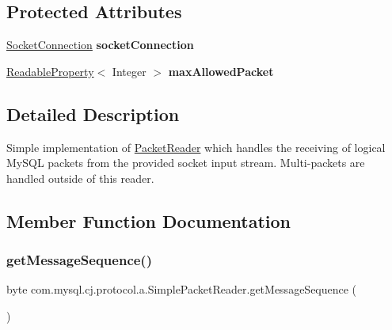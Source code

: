 \subsection*{Protected Attributes}
\begin{DoxyCompactItemize}
\item 
\mbox{\label{classcom_1_1mysql_1_1cj_1_1protocol_1_1a_1_1_simple_packet_reader_a6da8bf24cf02fc7519f2080940126bb8}} 
\mbox{\hyperlink{interfacecom_1_1mysql_1_1cj_1_1protocol_1_1_socket_connection}{Socket\+Connection}} {\bfseries socket\+Connection}
\item 
\mbox{\label{classcom_1_1mysql_1_1cj_1_1protocol_1_1a_1_1_simple_packet_reader_a05df0f4f040b4a5195123a749d231878}} 
\mbox{\hyperlink{interfacecom_1_1mysql_1_1cj_1_1conf_1_1_readable_property}{Readable\+Property}}$<$ Integer $>$ {\bfseries max\+Allowed\+Packet}
\end{DoxyCompactItemize}


\subsection{Detailed Description}
Simple implementation of \mbox{\hyperlink{}{Packet\+Reader}} which handles the receiving of logical My\+S\+QL packets from the provided socket input stream. Multi-\/packets are handled outside of this reader. 

\subsection{Member Function Documentation}
\mbox{\label{classcom_1_1mysql_1_1cj_1_1protocol_1_1a_1_1_simple_packet_reader_ac89192017a4a7eb78ab9679925857fd6}} 
\subsubsection{\texorpdfstring{get\+Message\+Sequence()}{getMessageSequence()}}
{\footnotesize\ttfamily byte com.\+mysql.\+cj.\+protocol.\+a.\+Simple\+Packet\+Reader.\+get\+Message\+Sequence (\begin{DoxyParamCaption}{ }\end{DoxyParamCaption})}

